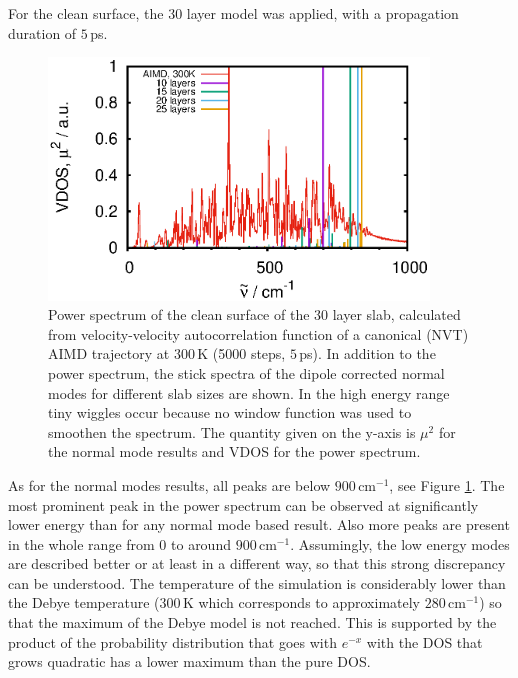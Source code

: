 \documentclass[11pt,DIV=13,BCOR=5mm,a4paper,headinclude]{scrbook}
\begin{document}
For the clean surface, the 30 layer model was applied, with a propagation duration of $5\,$ps.
\begin{figure}[!h]
    \centering
    \includegraphics[width=0.9\textwidth]{figures/11-20/comp_cleansurf_all.eps}%
             \caption{Power spectrum of the clean surface of the 30 layer slab, calculated from velocity-velocity autocorrelation function of a canonical (NVT) AIMD trajectory at $300\,$K (5000 steps, $5\,$ps).
In addition to the power spectrum, the stick spectra of the dipole corrected normal modes for different slab sizes are shown.
In the high energy range tiny wiggles occur because no window function was used to smoothen the spectrum.
The quantity given on the y-axis is $\mu^2$ for the normal mode results and VDOS for the power spectrum.} \label{abb:velvelclean}
\end{figure}
As for the normal modes results, all peaks are below $900\,$cm$^{-1}$, see Figure \ref{abb:velvelclean}.
The most prominent peak in the power spectrum can be observed at significantly lower energy than for any normal mode based result.
Also more peaks are present in the whole range from $0$ to around $900\,$cm$^{-1}$.
Assumingly, the low energy modes are described better or at least in a different way, so that this strong discrepancy can be understood.
The temperature of the simulation is considerably lower than the Debye temperature ($300\,$K which corresponds to approximately $280\,$cm$^{-1}$) so that the maximum of the Debye model is not reached.
This is supported by the product of the probability distribution that goes with $e^{-x}$ with the DOS that grows quadratic has a lower maximum than the pure DOS.
\\\\
\end{document}
